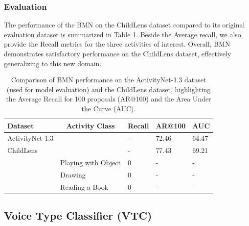 \documentclass[
  man,floatsintext]{apa6}
\begin{document}
\subsubsection{Evaluation}\label{evaluation}

The performance of the BMN on the ChildLens dataset compared to its original evaluation dataset is summarized in Table \ref{tab:bmn-results}. Beside the Average recall, we also provide the Recall metrics for the three activities of interest. Overall, BMN demonstrates satisfactory performance on the ChildLens dataset, effectively generalizing to this new domain.

\begin{table}[tbp]

\begin{center}
\begin{threeparttable}

\caption{\label{tab:bmn-results}Comparison of BMN performance on the ActivityNet-1.3 dataset (used for model evaluation) and the ChildLens dataset, highlighting the Average Recall for 100 proposals (AR@100) and the Area Under the Curve (AUC).}

\begin{tabular}{lllll}
\toprule
Dataset & \multicolumn{1}{c}{Activity Class} & \multicolumn{1}{c}{Recall} & \multicolumn{1}{c}{AR@100} & \multicolumn{1}{c}{AUC}\\
\midrule
ActivityNet-1.3 &  & - & 72.46 & 64.47\\
ChildLens &  & - & 77.43 & 69.21\\
 & Playing with Object & 0 & - & -\\
 & Drawing & 0 & - & -\\
 & Reading a Book & 0 & - & -\\
\bottomrule
\end{tabular}

\end{threeparttable}
\end{center}

\end{table}

\subsection{Voice Type Classifier (VTC)}\label{voice-type-classifier-vtc}
\end{document}
